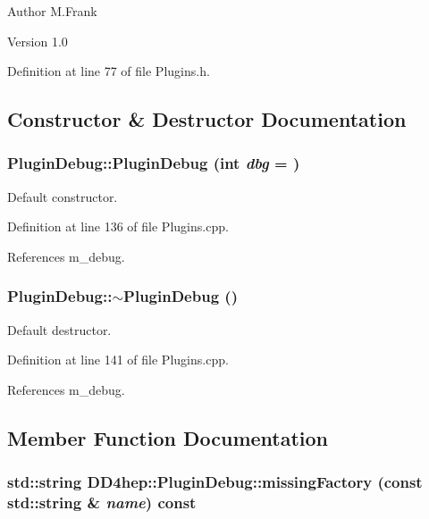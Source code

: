 \begin{DoxyAuthor}{Author}
M.Frank 
\end{DoxyAuthor}
\begin{DoxyVersion}{Version}
1.0 
\end{DoxyVersion}


Definition at line 77 of file Plugins.h.

\subsection{Constructor \& Destructor Documentation}
\hypertarget{struct_d_d4hep_1_1_plugin_debug_a26deb60f08bc415d15c180a7fb5167b5}{
\subsubsection[{PluginDebug}]{\setlength{\rightskip}{0pt plus 5cm}PluginDebug::PluginDebug (int {\em dbg} = {})}}
\label{struct_d_d4hep_1_1_plugin_debug_a26deb60f08bc415d15c180a7fb5167b5}


Default constructor. 

Definition at line 136 of file Plugins.cpp.

References m\_\-debug.\hypertarget{struct_d_d4hep_1_1_plugin_debug_a5c64d5a172b4d20b94d7a367e09a58f1}{
\subsubsection[{$\sim$PluginDebug}]{\setlength{\rightskip}{0pt plus 5cm}PluginDebug::$\sim$PluginDebug ()}}
\label{struct_d_d4hep_1_1_plugin_debug_a5c64d5a172b4d20b94d7a367e09a58f1}


Default destructor. 

Definition at line 141 of file Plugins.cpp.

References m\_\-debug.

\subsection{Member Function Documentation}
\hypertarget{struct_d_d4hep_1_1_plugin_debug_a93143c7d731e176fe8c7a791edf01c28}{
\subsubsection[{missingFactory}]{\setlength{\rightskip}{0pt plus 5cm}std::string DD4hep::PluginDebug::missingFactory (const std::string \& {\em name}) const}}
\label{struct_d_d4hep_1_1_plugin_debug_a93143c7d731e176fe8c7a791edf01c28}


